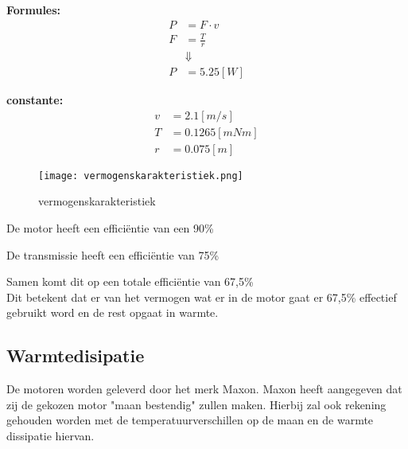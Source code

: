 \begin{multicols}{2}
        \textbf{Formules:}
        \begin{equation}
            \begin{split}
                P &= F \cdot v \\
                F &= \frac{T}{r} \\
                &\Downarrow \\
                P &= 5.25 [W]
            \end{split}
        \end{equation}

        \textbf{constante:}
        \begin{equation*}
            \begin{split}
                v &= 2.1 [m/s] \\
                T &= 0.1265[mNm]  \\
                r &= 0.075[m]
            \end{split}
        \end{equation*}
    \end{multicols}

    \begin{figure}[H]
        \centering
        \texttt{[image: vermogenskarakteristiek.png]}
        \caption{vermogenskarakteristiek}
        \label{fig:vermogenskarakteristiek}
        \end{figure}

De motor heeft een efficiëntie van een 90\%

De transmissie heeft een efficiëntie van 75\%

Samen komt dit op een totale efficiëntie van 67,5\% \\
Dit betekent dat er van het vermogen wat er in de motor gaat er 67,5\% effectief gebruikt word en de rest opgaat in warmte.

\subsection{Warmtedisipatie}

De motoren worden geleverd door het merk Maxon. Maxon heeft aangegeven dat zij de gekozen motor "maan bestendig" zullen maken. Hierbij zal ook rekening gehouden worden met de temperatuurverschillen op de maan en de warmte dissipatie hiervan. 